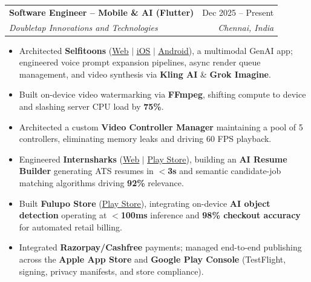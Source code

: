 \documentclass[letterpaper,10pt]{article}
\makeatletter
\newcommand{\resumeItem}[1]{
  \item\small{
    {#1 \vspace{-2pt}}
  }
}
\newcommand{\resumeSubheading}[4]{
  \vspace{-2pt}\item
    \begin{tabular*}{0.97\textwidth}[t]{l@{\extracolsep{\fill}}r}
      \textbf{#1} & #2 \\
      \textit{\small#3} & \textit{\small #4} \\
    \end{tabular*}\vspace{-7pt}
}
\newcommand{\resumeItemListStart}{\begin{itemize}}
\newcommand{\resumeItemListEnd}{\end{itemize}\vspace{-5pt}}
\makeatother
\begin{document}
    \resumeSubheading
      {Software Engineer -- Mobile \& AI (Flutter)}{Dec 2025 -- Present}
      {Doubletap Innovations and Technologies}{Chennai, India}
      \resumeItemListStart
        \resumeItem{Architected \textbf{Selfitoons} (\href{https://selfitoons.ai/}{\underline{Web}} $|$ \href{https://apps.apple.com/in/app/selfitoons/id6758597947}{\underline{iOS}} $|$ \href{https://play.google.com/store/apps/details?id=com.doubletap.ai.selfitoons}{\underline{Android}}), a multimodal GenAI app; engineered voice prompt expansion pipelines, async render queue management, and video synthesis via \textbf{Kling AI} \& \textbf{Grok Imagine}.}
        \resumeItem{Built on-device video watermarking via \textbf{FFmpeg}, shifting compute to device and slashing server CPU load by \textbf{75\%}.}
        \resumeItem{Architected a custom \textbf{Video Controller Manager} maintaining a pool of 5 controllers, eliminating memory leaks and driving 60 FPS playback.}
        \resumeItem{Engineered \textbf{Internsharks} (\href{https://internsharks.ai/}{\underline{Web}} $|$ \href{https://play.google.com/store/apps/details?id=com.doubletap.internsharks.ai}{\underline{Play Store}}), building an \textbf{AI Resume Builder} generating ATS resumes in \textbf{$<$3s} and semantic candidate-job matching algorithms driving \textbf{92\%} relevance.}
        \resumeItem{Built \textbf{Fulupo Store} (\href{https://play.google.com/store/apps/details?id=com.doubletap.fulupostore}{\underline{Play Store}}), integrating on-device \textbf{AI object detection} operating at \textbf{$<$100ms} inference and \textbf{98\% checkout accuracy} for automated retail billing.}
        \resumeItem{Integrated \textbf{Razorpay/Cashfree} payments; managed end-to-end publishing across the \textbf{Apple App Store} and \textbf{Google Play Console} (TestFlight, signing, privacy manifests, and store compliance).}
      \resumeItemListEnd
\end{document}
